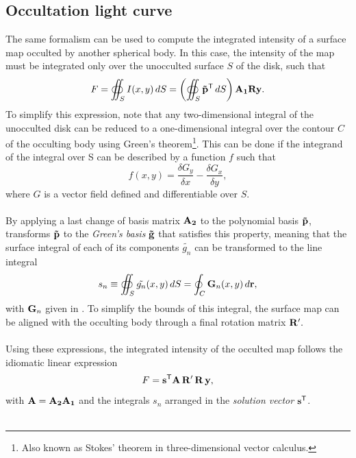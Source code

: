 \documentclass[modern]{aastex631}
\begin{document}
\subsection{Occultation light curve}
The same formalism can be used to compute the integrated intensity of a surface map occulted by another spherical body. In this case, the intensity of the map must be integrated only over the unocculted surface $S$ of the disk, such that 
$$ F = \oiint_S I(x,y)\,dS = \left(\oiint_S {\mathbf{\tilde p^\mathsf{T}}}\,dS\right){\mathbf{A_1}}{\mathbf{R}}{\mathbf{y}}.$$
To simplify this expression, \citealt{pal2012} note that any two-dimensional integral of the unocculted disk can be reduced to a one-dimensional integral over the contour $C$ of the occulting body using Green's theorem\footnote{Also known as Stokes' theorem in three-dimensional vector calculus.}. This can be done if the integrand of the integral over S can be described by a function $f$ such that
$$f(x, y) = \frac{\delta G_{y}}{\delta x}-\frac{\delta G_{x}}{\delta y},$$
where $G$ is a vector field defined and differentiable over $S$.\\\\
By applying a last change of basis matrix ${\mathbf{A_2}}$ to the polynomial basis ${\mathbf{\tilde p}}$, \citealt{starry} transforms ${\mathbf{\tilde p}}$ to the \textit{Green's basis} ${\mathbf{\tilde g}}$ that satisfies this property, meaning that the surface integral of each of its components $\tilde{g_n}$ can be transformed to the line integral
$$s_n \equiv \oiint_S \tilde{g_n}(x, y)\,dS = \oint_C {\mathbf{G}}_n(x, y)\,d{\mathbf{r}},$$
with ${\mathbf{G}}_n$ given in \citealt[Equation 34]{starry}. To simplify the bounds of this integral, the surface map can be aligned with the occulting body through a final rotation matrix ${\mathbf{R'}}.$\\\\
Using these expressions, the integrated intensity of the occulted map follows the idiomatic linear expression 
$$F = {\mathbf{s^\mathsf{T}}}{\mathbf{A}}\,{\mathbf{R'}}\,{\mathbf{R}}\,{\mathbf{y}},$$
with ${\mathbf{A}} = {\mathbf{A_2A_1}}$ and the integrals $s_n$ arranged in the \textit{solution vector} ${\mathbf{s^\mathsf{T}}}$.\\\\
\end{document}
